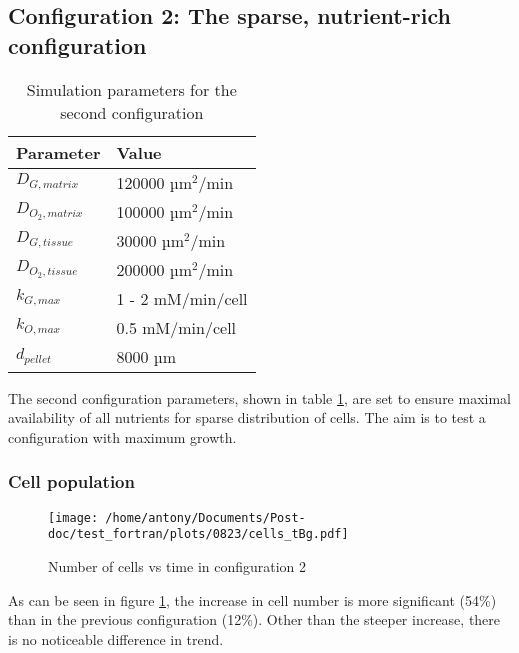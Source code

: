 \documentclass[11pt,a4paper]{article}
\begin{document}
\newpage
\subsection{Configuration 2: The sparse, nutrient-rich configuration}	

\begin{table}[h!]
\begin{center}
\begin{tabular}{ |p{20mm}|p{45mm}| }
\hline 
\textbf{Parameter} & \textbf{Value}\\
\hline
\hline
$D_{G,matrix}$ & 120000 µm$^2$/min \\
\hline
$D_{O_2,matrix}$ & 100000 µm$^2$/min \\
\hline
$D_{G,tissue}$ & 30000 µm$^2$/min \\
\hline
$D_{O_2,tissue}$ & 200000 µm$^2$/min \\
\hline
$k_{G,max}$ & 1 - 2 mM/min/cell \\
\hline
$k_{O,max}$ & 0.5 mM/min/cell \\
\hline
$d_{pellet}$ & 8000 µm\\
\hline
\end{tabular}
\caption{Simulation parameters for the second configuration \label{params2}}   
\end{center}
\end{table} 


The second configuration parameters, shown in table \ref{params2}, are set to ensure maximal availability of all nutrients for sparse distribution of cells. The aim is to test a configuration with maximum growth.\\

\subsubsection{Cell population}

\begin{figure}[ht!]
\begin{center}
\texttt{[image: /home/antony/Documents/Post-doc/test\_fortran/plots/0823/cells\_tBg.pdf]}
\caption{Number of cells vs time in configuration 2\label{cells_tB}}
\end{center}
\end{figure}

As can be seen in figure \ref{cells_tB}, the increase in cell number is  more significant (54\%) than in the previous configuration (12\%). Other than the steeper increase, there is no noticeable difference in trend.\\
\end{document}
